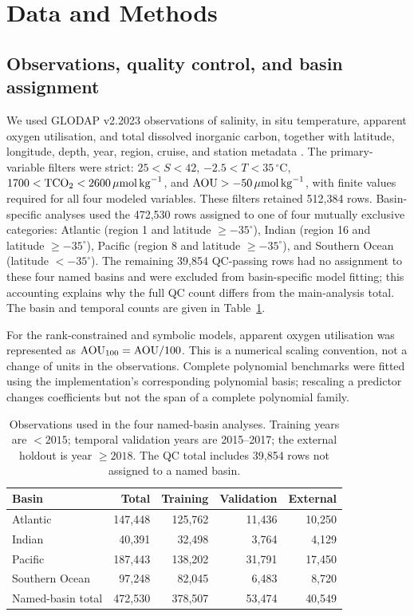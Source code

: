 \section{Data and Methods}

\subsection{Observations, quality control, and basin assignment}
We used GLODAP v2.2023 observations of salinity, in situ temperature, apparent oxygen utilisation, and total dissolved inorganic carbon, together with latitude, longitude, depth, year, region, cruise, and station metadata \citep{Lauvset2023}. The primary-variable filters were strict: $25<S<42$, $-2.5<T<35\,^{\circ}\mathrm{C}$, $1700<\mathrm{TCO_2}<2600\,\mu\mathrm{mol}\,\mathrm{kg}^{-1}$, and $\mathrm{AOU}>-50\,\mu\mathrm{mol}\,\mathrm{kg}^{-1}$, with finite values required for all four modeled variables. These filters retained 512,384 rows. Basin-specific analyses used the 472,530 rows assigned to one of four mutually exclusive categories: Atlantic (region 1 and latitude $\geq-35^{\circ}$), Indian (region 16 and latitude $\geq-35^{\circ}$), Pacific (region 8 and latitude $\geq-35^{\circ}$), and Southern Ocean (latitude $<-35^{\circ}$). The remaining 39,854 QC-passing rows had no assignment to these four named basins and were excluded from basin-specific model fitting; this accounting explains why the full QC count differs from the main-analysis total. The basin and temporal counts are given in Table~\ref{tab:sample_sizes}.

For the rank-constrained and symbolic models, apparent oxygen utilisation was represented as $\mathrm{AOU}_{100}=\mathrm{AOU}/100$. This is a numerical scaling convention, not a change of units in the observations. Complete polynomial benchmarks were fitted using the implementation's corresponding polynomial basis; rescaling a predictor changes coefficients but not the span of a complete polynomial family.

\begin{table}[htbp]
\centering
\caption{Observations used in the four named-basin analyses. Training years are $<2015$; temporal validation years are 2015--2017; the external holdout is year $\geq2018$. The QC total includes 39,854 rows not assigned to a named basin.}
\label{tab:sample_sizes}
\small
\begin{tabular}{lrrrr}
\toprule
Basin & Total & Training & Validation & External \\
\midrule
Atlantic & 147,448 & 125,762 & 11,436 & 10,250 \\
Indian & 40,391 & 32,498 & 3,764 & 4,129 \\
Pacific & 187,443 & 138,202 & 31,791 & 17,450 \\
Southern Ocean & 97,248 & 82,045 & 6,483 & 8,720 \\
\midrule
Named-basin total & 472,530 & 378,507 & 53,474 & 40,549 \\
\bottomrule
\end{tabular}
\end{table}

